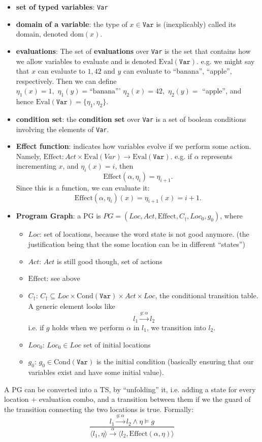 \documentclass{article}
\begin{document}
\begin{itemize}
\item \textbf{set of typed variables}: \texttt{Var}
\item \textbf{domain of a variable}: the type of $x \in \texttt{Var}$ is
  (inexplicably) called its domain, denoted $\text{dom}(x)$.

\item \textbf{evaluations}: The set of \textbf{evaluations} over \texttt{Var} is
  the set that contains how we allow variables to evaluate and is denoted
  $\text{Eval}(\texttt{Var})$. e.g. we might say
  that $x$ can evaluate to $1, 42$ and $y$ can evaluate to ``banana'',
  ``apple'', respectively. Then we
  can define $\eta_1(x)=1,\,\,\eta_1(y)=\text{``banana'''}\,\,\eta_2(x)=42,\,\,\eta_2(y)=$ ``apple'', and hence
  $\text{Eval}(\texttt{Var}) = \{\eta_1, \eta_2\}$.

\item \textbf{condition set}: the \textbf{condition set} over \texttt{Var} is a
  set of boolean conditions involving the elements of \texttt{Var}.

\item \textbf{Effect function}: indicates how variables evolve if we perform
  some action. Namely, $\text{Effect}: Act \times \text{Eval}(Var) \rightarrow
  \text{Eval}(\texttt{Var})$. e.g. if $\alpha$ represents incrementing $x$, and
  $\eta_i(x) = i$, then
  \[
    \text{Effect}(\alpha, \eta_i) = \eta_{i + 1}.
  \]
  Since this is a function, we can evaluate it:
  \[
    \text{Effect}(\alpha, \eta_i)(x) = \eta_{i + 1}(x) = i + 1.
  \]

\item \textbf{Program Graph}: a PG is $PG = (Loc, Act, \text{Effect}, C_\dagger, Loc_0,
  g_0)$, where
  \begin{itemize}
  \item $Loc$: set of locations, because the word state is not good anymore.
    (the justification being that the some location can be in different ``states'')
  \item $Act$: $Act$ is still good though, set of actions 
  \item $\text{Effect}$: see above
  \item $C_\dagger$: $C_\dagger \subseteq Loc \times
    \text{Cond}(\texttt{Var})\times Act \times Loc$, the conditional transition
    table. A generic element looks like
    \[
      l_1 \xrightarrow{g:\alpha} l_2
    \]
    i.e. if $g$ holds when we perform $\alpha$ in $l_1$, we transition into $l_2$.
  \item $Loc_0$: $Loc_0 \in Loc$ set of initial locations
  \item $g_0$: $g_0 \in \text{Cond}(\texttt{Var})$ is the initial condition
    (basically ensuring that our variables exist and have some initial value).
  \end{itemize}
\end{itemize}
A PG can be converted into a TS, by ``unfolding'' it, i.e. adding a state for
every location + evaluation combo, and a transition between them if we the guard
of the transition connecting the two locations is true. Formally:
\[
  \frac{l_1 \xrightarrow{g:\alpha} l_2 \land \eta \vDash g}{\langle l_1, \eta
    \rangle \xrightarrow{\alpha} \langle l_2, \text{Effect}(\alpha, \eta) \rangle}
\]
\end{document}
